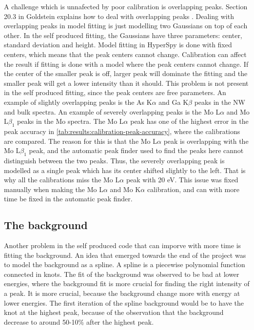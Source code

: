 A challenge which is unnafected by poor calibration is overlapping peaks.
Section 20.3 in Goldstein explains how to deal with overlapping peaks \cite{goldstein_scanning_2018}.
Dealing with overlapping peaks in model fitting is just modelling two Gaussians on top of each other.
In the self produced fitting, the Gaussians have three parameters: center, standard deviation and height.
Model fitting in HyperSpy is done with fixed centers, which means that the peak centers cannot change.
Calibration can affect the result if fitting is done with a model where the peak centers cannot change.
If the center of the smaller peak is off, larger peak will dominate the fitting and the smaller peak will get a lower intensity than it should.
This problem is not present in the self produced fitting, since the peak centers are free parameters.
An example of slightly overlapping peaks is the As K$\alpha$ and Ga K$\beta$ peaks in the NW and bulk spectra.
An example of severely overlapping peaks is the Mo L$\alpha$ and Mo L$\beta_1$ peaks in the Mo spectra.
The Mo L$\alpha$ peak has one of the highest error in the peak accuracy in \cref{tab:results:calibration-peak-accuracy}, where the calibrations are compared. The reason for this is that the Mo L$\alpha$ peak is overlapping with the Mo L$\beta_1$ peak, and the automatic peak finder used to find the peaks here cannot distinguish between the two peaks.
Thus, the severely overlapping peak is modelled as a single peak which has its center shifted slightly to the left.
That is why all the calibrations miss the Mo L$\alpha$ peak with 20 eV.
This issue was fixed manually when making the Mo L$\alpha$ and Mo K$\alpha$ calibration, and can with more time be fixed in the automatic peak finder.




























\subsection{The background}
\label{sec:discussion:general:background}
Another problem in the self produced code that can imporve with more time is fitting the background.
An idea that emerged towards the end of the project was to model the background as a spline.
A spline is a piecewise polynomial function connected in knots.
The fit of the background was observed to be bad at lower energies, where the background fit is more crucial for finding the right intensity of a peak.
It is more crucial, because the background change more with energy at lower energies.
The first iteration of the spline background would be to have the knot at the highest peak, because of the observation that the background decrease to around 50-10\% after the highest peak.


